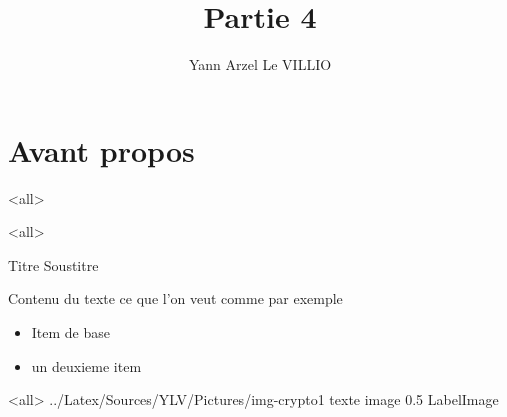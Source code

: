 
%


\title{Partie 4}
\author{Yann Arzel Le VILLIO}



\maketitle

\section{Avant propos}





\mode<all>{}





\mode<all>{\texframe
{Titre} %
{Soustitre} %
{
	Contenu du texte ce que l'on veut comme par exemple
 \begin{itemize}
    \item Item de base
    \item un deuxieme item
 \end{itemize}
}}


\mode<all>{\picframe
{../Latex/Sources/YLV/Pictures/img-crypto1}%
{texte image} %
{0.5} %
{LabelImage} %
}
